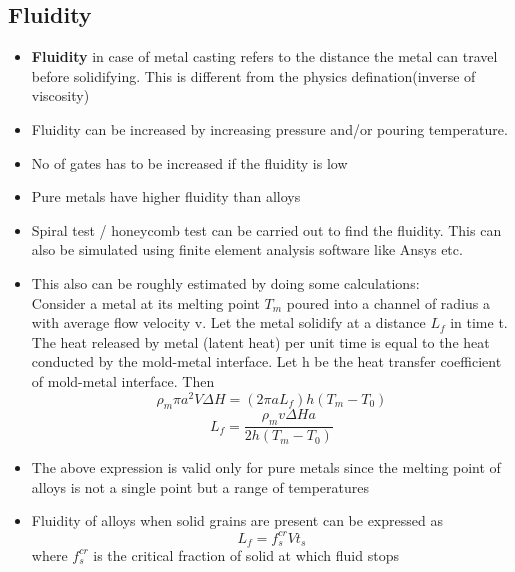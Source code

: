 \documentclass{article}
\begin{document}
	\subsection{Fluidity}
	\begin{itemize}
		\item \textbf{Fluidity} in case of metal casting refers to the distance the metal can travel before solidifying. This is different from the physics defination(inverse of viscosity)
		\item Fluidity can be increased by increasing pressure and/or pouring temperature.
		\item No of gates has to be increased if the fluidity is low
		\item Pure metals have higher fluidity than alloys

		\item Spiral test / honeycomb test can be carried out to find the fluidity. This can also be simulated using finite element analysis software like Ansys etc.
		\item This also can be roughly estimated by doing some calculations:\\
		Consider a metal at its melting point $T_m$ poured into a channel of radius a with average flow velocity v. Let the metal solidify at a distance $L_f$ in time t. The heat released by metal (latent heat) per unit time is equal to the heat conducted by the mold-metal interface. Let h be the heat transfer coefficient of mold-metal interface. Then
		\[\rho_m \pi a^2 V \Delta H = (2 \pi a L_f) h (T_m - T_0)\]
		\[{L_f = \frac{\rho_m v \Delta H a}{2 h (T_m - T_0)}}\]
		\item The above expression is valid only for pure metals since the melting point of alloys is not a single point but a range of temperatures

		\item Fluidity of alloys when solid grains are present can be expressed as
		\[L_f = f_s^{cr} V t_s\]
		where $f_s^{cr}$ is the critical fraction of solid at which fluid stops
	\end{itemize}
\end{document}
